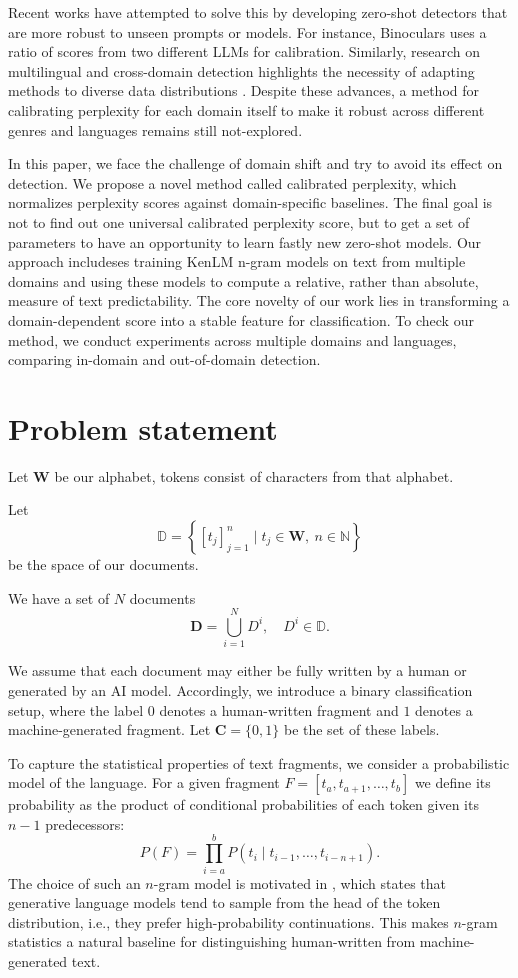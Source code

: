 \documentclass{article}
\begin{document}
Recent works have attempted to solve this by developing zero-shot detectors that are more robust to unseen prompts or models. For instance, Binoculars \cite{hans2024spotting} uses a ratio of scores from two different LLMs for calibration. Similarly, research on multilingual and cross-domain detection highlights the necessity of adapting methods to diverse data distributions \cite{gritsay2023artificially}. Despite these advances, a method for calibrating perplexity for each domain itself to make it robust across different genres and languages remains still not-explored.

In this paper, we face the challenge of domain shift and try to avoid its effect on detection. We propose a novel method called calibrated perplexity, which normalizes perplexity scores against domain-specific baselines. The final goal is not to find out one universal calibrated perplexity score, but to get a set of parameters to have an opportunity to learn fastly new zero-shot models. Our approach includeses training KenLM n-gram models on text from multiple domains and using these models to compute a relative, rather than absolute, measure of text predictability. The core novelty of our work lies in transforming a domain-dependent score into a stable feature for classification. To check our method, we conduct experiments across multiple domains and languages, comparing in-domain and out-of-domain detection.


\section{Problem statement}

Let $\mathbf{W}$ be our alphabet, tokens consist of characters from that alphabet.

Let 
\[
\mathbb{D} = \left\{ \left[ t_j \right]_{j=1}^n \;\Big|\; t_j \in \mathbf{W},\ n \in \mathbb{N} \right\}
\]
be the space of our documents.

We have a set of $N$ documents
\[
\mathbf{D} = \bigcup_{i=1}^{N} D^i,\quad D^i \in \mathbb{D}.
\]

We assume that each document may either be fully written by a human or generated by an AI model. Accordingly, we introduce a binary classification setup, where the label $0$ denotes a human-written fragment and $1$ denotes a machine-generated fragment. Let $\mathbf{C} = \{0, 1\}$ be the set of these labels.

To capture the statistical properties of text fragments, we consider a probabilistic model of the language. For a given fragment $F = [t_a, t_{a+1}, \dots, t_b]$ we define its probability as the product of conditional probabilities of each token given its $n-1$ predecessors:
\[
P(F) = \prod_{i=a}^{b} P(t_i \mid t_{i-1}, \dots, t_{i-n+1}).
\]
The choice of such an $n$-gram model is motivated in \cite{gritsay2023artificially}, which states that generative language models tend to sample from the head of the token distribution, i.e., they prefer high-probability continuations. This makes $n$-gram statistics a natural baseline for distinguishing human-written from machine-generated text.
\end{document}

